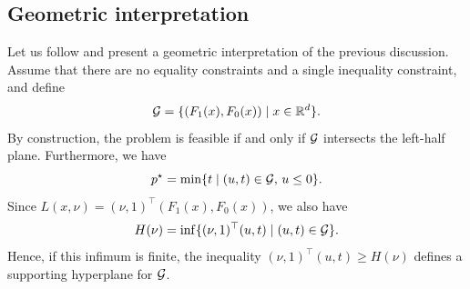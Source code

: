  
 
     \subsection*{Geometric interpretation}
 
     Let us follow \cite[Section~5.3]{boydConvex2023} and present a geometric interpretation of the previous discussion.
     Assume that there are no equality constraints and a single inequality constraint, and define
     \begin{equation}
         \mathcal{G} = \{ (F_1(x), F_0(x)) \mid x\in \mathbb{R}^d\}.
     \end{equation}
     By construction, the problem is feasible if and only if $\mathcal{G}$ intersects the left-half plane.
     Furthermore, we have
     \begin{equation}
         p^\star  = \min\{ t \mid (u,t)\in \mathcal{G},\, u\le 0\}.
     \end{equation}
     Since $L(x,\nu) = (\nu,1)^\top (F_1(x),F_0(x))$, we also have
     \begin{equation}
         H(\nu) = \inf \{  (\nu,1)^\top (u,t) \mid (u,t)\in \mathcal{G} \}.
     \end{equation}
     Hence, if this infimum is finite, the inequality $(\nu,1)^\top (u,t)\ge H(\nu)$ defines a supporting hyperplane for $\mathcal{G}$.
 
